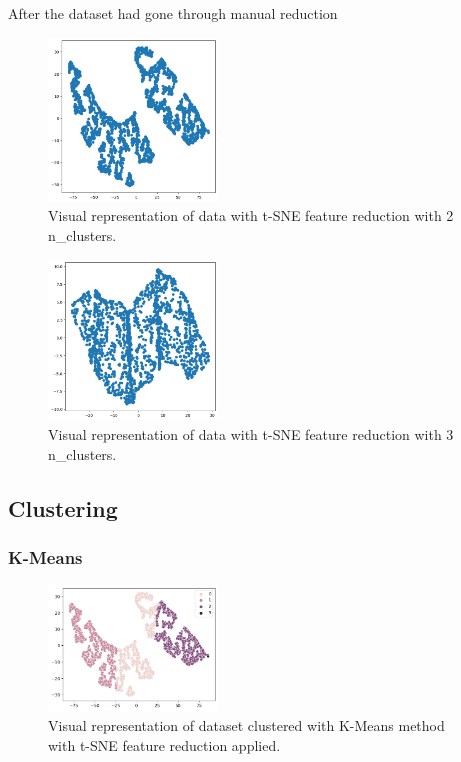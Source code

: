 \documentclass{article}
\begin{document}
\begin{multicols}{2}
After the dataset had gone through manual reduction

\begin{figure}[H]
    \centering
    \includegraphics[width=0.4\textwidth]{images/tsne_2.png}
    \caption{Visual representation of data with t-SNE feature reduction with 2 n\_clusters.}
\end{figure}

\begin{figure}[H]
    \centering
    \includegraphics[width=0.4\textwidth]{images/tsne_3.png}
    \caption{Visual representation of data with t-SNE feature reduction with 3 n\_clusters.}
\end{figure}

\subsection{Clustering}

\subsubsection{K-Means}

\begin{figure}[H]
    \centering
    \includegraphics[width=0.4\textwidth]{images/kmeans.png}
    \caption{Visual representation of dataset clustered with K-Means method with t-SNE feature reduction applied.}
\end{figure}


\end{multicols}
\end{document}
